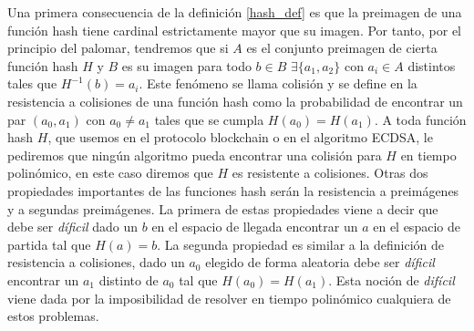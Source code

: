 Una primera consecuencia de la definición \ref{hash_def} es que la preimagen de una función hash tiene cardinal estrictamente mayor que su imagen. Por tanto, por el principio del palomar, tendremos que si $A$ es el conjunto preimagen de cierta función hash $H$ y $B$ es su imagen para todo $b \in B$  $\exists \{a_{1},a_{2}\}$ con $a_{i} \in A$ distintos tales que $H^{-1}(b) = a_i$. Este fenómeno se llama colisión y se define en la resistencia a colisiones de una función hash como la probabilidad de encontrar un par $(a_{0},a_{1})$ con $a_{0} \not= a_{1}$ tales que se cumpla  $H(a_{0}) = H(a_{1})$. A toda función hash $H$, que usemos en el protocolo blockchain o en el algoritmo ECDSA, le pediremos que ningún algoritmo pueda encontrar una colisión para $H$ en tiempo polinómico, en este caso diremos que $H$ es resistente a colisiones. Otras dos propiedades importantes de las funciones hash serán la resistencia a preimágenes y a segundas preimágenes. La primera de estas propiedades viene a decir que debe ser \textit{díficil} dado un $b$ en el espacio de llegada encontrar un $a$ en el espacio de partida tal que $H(a) = b$. La segunda propiedad es similar a la definición de resistencia a colisiones, dado un $a_{0}$ elegido de forma aleatoria debe ser \textit{díficil} encontrar un $a_{1}$ distinto de $a_{0}$ tal que $H(a_{0}) = H(a_{1})$. Esta noción de \textit{difícil} viene dada por la imposibilidad de resolver en tiempo polinómico cualquiera de estos problemas.

